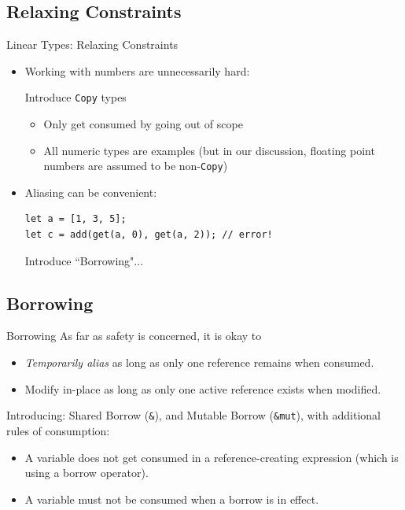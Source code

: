 \documentclass[xcolor=x11names,compress]{beamer}
\renewcommand{\(}{\begin{columns}}
\renewcommand{\)}{\end{columns}}
\newcommand{\<}[1]{\begin{column}{#1}}
\renewcommand{\>}{\end{column}}
\begin{document}
\subsection{Relaxing Constraints}
\begin{frame}[fragile]{Linear Types: Relaxing Constraints}
\begin{itemize}
\item Working with numbers are unnecessarily hard:

Introduce \texttt{Copy} types
\begin{itemize}
    \item Only get consumed by going out of scope
    \item All numeric types are examples (but in our discussion, floating point numbers are assumed to be non-\texttt{Copy})
\end{itemize}
\item Aliasing can be convenient:
\begin{lstlisting}
let a = [1, 3, 5];
let c = add(get(a, 0), get(a, 2)); // error!
\end{lstlisting}
Introduce ``Borrowing"...
\end{itemize}
\end{frame}

\subsection{Borrowing}
\begin{frame}{Borrowing}
As far as safety is concerned, it is okay to
\begin{itemize}
    \item \textit{Temporarily alias} as long as only one reference remains when consumed.
    \pause
    \item Modify in-place as long as only one active reference exists when modified.
\end{itemize}
\pause
Introducing: Shared Borrow (\texttt{\&}), and Mutable Borrow (\texttt{\&mut}), with additional rules of consumption:
\begin{itemize}
\item A variable does not get consumed in a reference-creating expression (which is using a borrow operator).
\pause
\item A variable must not be consumed when a borrow is in effect.
\end{itemize}
\end{frame}
\end{document}
